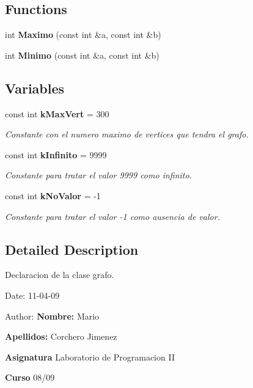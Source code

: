\subsection*{Functions}
\begin{CompactItemize}
\item 
int {\bf Maximo} (const int \&a, const int \&b)
\item 
int {\bf Minimo} (const int \&a, const int \&b)
\end{CompactItemize}
\subsection*{Variables}
\begin{CompactItemize}
\item 
const int {\bf kMaxVert} = 300
\begin{CompactList}\small\item\em Constante con el numero maximo de vertices que tendra el grafo. \item\end{CompactList}\item 
const int {\bf kInfinito} = 9999
\begin{CompactList}\small\item\em Constante para tratar el valor 9999 como infinito. \item\end{CompactList}\item 
const int {\bf kNoValor} = -1
\begin{CompactList}\small\item\em Constante para tratar el valor -1 como ausencia de valor. \item\end{CompactList}\end{CompactItemize}


\subsection{Detailed Description}
Declaracion de la clase grafo. 

\begin{Desc}
\item[Date:]11-04-09 \end{Desc}
\begin{Desc}
\item[Author:]{\bf Nombre:} Mario \par
 {\bf Apellidos:} Corchero Jimenez \par
 {\bf Asignatura} Laboratorio de Programacion II \par
 {\bf Curso} 08/09 \end{Desc}


